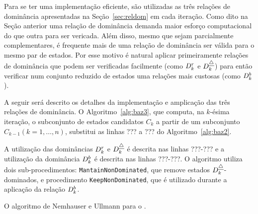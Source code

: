 Para se ter uma implementação eficiente, são utilizadas as três relações de
dominância apresentadas na Seção~\ref{sec:reldom} em cada iteração.
Como dito na Seção anterior uma relação de dominância demanda maior
esforço computacional do que outra para ser vericada.
Além disso, mesmo que sejam parcialmente complementares,
é frequente mais de uma relação de dominância ser válida para o mesmo par de estados.
Por esse motivo é natural aplicar primeiramente relações de dominância que
podem ser verificadas facilmente (como $D_k^r$ e $D_k^{\underline{\triangle}}$)
para então verificar num conjunto reduzido de estados uma relações mais
custosas (como $D_k^{b}$).

A seguir será descrito os detalhes da implementação e amplicação
das três relações de dominância.
O Algoritmo~\ref{alg:baz3}, que computa, na $k$-ésima iteração, o subconjunto
de estados candidatos $C_k$ a partir de um subconjunto
$C_{k-1} (k = 1, \ldots, n)$, substitui as linhas ??? a ??? do Algoritmo~\ref{alg:baz2}.

A utilização das dominâncias $D_k^r$ e $D_k^{\underline{\triangle}}$ é descrita nas linhas ???-???
e a utilização da dominância $D_k^{b}$ é descrita nas linhas ???-???.
O algoritmo utiliza dois sub-procedimentos: \texttt{MantainNonDominated},
que remove estados $D_k^{\underline{\triangle}}$-dominados, e procedimento \texttt{KeepNonDominated},
que é utilizado durante a aplicação da relação $D_k^{b}$.

\begin{algorithm}
  \caption{O algoritmo de Nemhauser e Ullmann para o \mokp.}
  \label{alg:baz3}
  
\end{algorithm}






